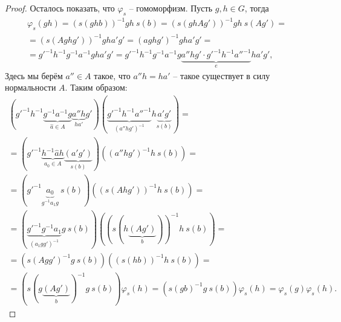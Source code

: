 \documentclass{article}
\begin{document}
\begin{proof}
    Осталось показать, что $\varphi_s$ -- гомоморфизм. Пусть $g, h \in G$, тогда
    \begin{multline*}
        \varphi_s(gh) = (s(gh b))^{-1} gh \ s(b) = (s(gh Ag'))^{-1} gh \ s(Ag') = \\
        = (s(Aghg'))^{-1} gh a'g' = (aghg')^{-1} g h a' g' = \\
        = {g'}^{-1} h^{-1} g^{-1} a^{-1} g h a' g' = {g'}^{-1} h^{-1} g^{-1} a^{-1} g \underbrace{a'' h g' \cdot {g'}^{-1} h^{-1} {a''}^{-1}}_{e} h a' g',
    \end{multline*}
    Здесь мы берём $a'' \in A$ такое, что $a'' h = h a'$ -- такое существует в силу нормальности $A$. Таким образом:
    \begin{multline*}
        \left({g'}^{-1} h^{-1} \underbrace{g^{-1} a^{-1} g}_{\widehat{a} \in A} \underbrace{a'' h}_{h a'} g' \right) \left(\underbrace{{g'}^{-1} h^{-1} {a''}^{-1}}_{(a'' h g')^{-1}} h \underbrace{a' g'}_{s(b)}\right) = \\
        = \left({g'}^{-1} \underbrace{h^{-1} \widehat{a} h}_{a_0 \in A} \underbrace{(a' g')}_{s(b)} \right) \left( (a'' h g')^{-1} h \ s(b) \right) = \\
        = \left( {g'}^{-1} \underbrace{a_0}_{g^{-1} a_1 g} \ s(b) \right) \left( (s(Ahg'))^{-1} h \ s(b) \right) = \\
        =  \left( \underbrace{{g'}^{-1} g^{-1} a_1}_{(a_1 g g')^{-1}} g \ s(b) \right) \left( (s(h\underbrace{(Ag')}_{b}))^{-1} h \ s(b) \right) = \\
        = \left( s(A g g')^{-1} g \ s(b) \right) \left( (s(hb))^{-1} h \ s(b) \right) = \\
        = \left( s(g \underbrace{(A g')}_{b})^{-1} g \ s(b) \right) \varphi_s(h) = \left( s(g b)^{-1} g \ s(b) \right) \varphi_s(h) = \varphi_s(g) \varphi_s(h).
    \end{multline*}
\end{proof}
\end{document}
